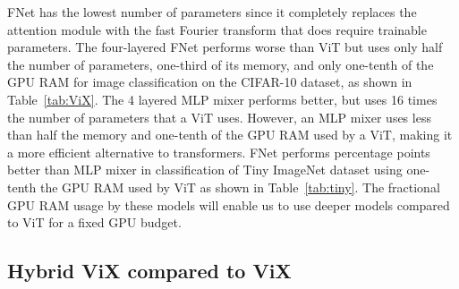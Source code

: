 \documentclass{article}
\begin{document}
FNet has the lowest number of parameters since it completely replaces the attention module with the fast Fourier transform that does require trainable parameters. The four-layered FNet performs  worse than ViT but uses only half the number of parameters, one-third of its memory, and only one-tenth of the GPU RAM for image classification on the CIFAR-10 dataset, as shown in Table~\ref{tab:ViX}. The 4 layered MLP mixer performs  better, but uses 16 times the number of parameters that a ViT uses. However, an MLP mixer uses less than half the memory and one-tenth of the GPU RAM used by a ViT, making it a more efficient alternative to transformers. FNet performs  percentage points better than MLP mixer in classification of Tiny ImageNet dataset using one-tenth the GPU RAM used by ViT as shown in Table~\ref{tab:tiny}. The fractional GPU RAM usage by these models will enable us to use deeper models compared to ViT for a fixed GPU budget. 


\subsection{Hybrid ViX compared to ViX}
\end{document}
